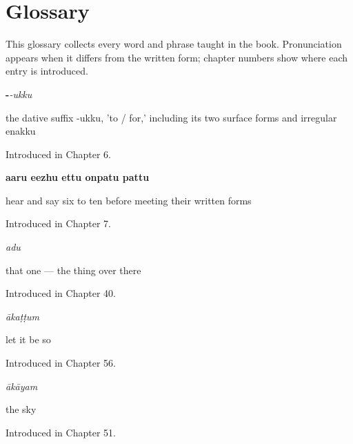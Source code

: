 
\chapter*{Glossary}

This glossary collects every word and phrase taught in the book. Pronunciation appears when it differs from the written form; chapter numbers show where each entry is introduced.

\noindent\begin{minipage}[t]{\linewidth}
\raggedright
\textbf{-}\enspace\emph{-ukku}\par
\small the dative suffix -ukku, 'to / for,' including its two surface forms and irregular enakku\par
\footnotesize Introduced in Chapter 6.
\end{minipage}\par\medskip

\noindent\begin{minipage}[t]{\linewidth}
\raggedright
\textbf{aaru eezhu ettu onpatu pattu}\par
\small hear and say six to ten before meeting their written forms\par
\footnotesize Introduced in Chapter 7.
\end{minipage}\par\medskip

\noindent\begin{minipage}[t]{\linewidth}
\raggedright
\textbf{}\enspace\emph{adu}\par
\small that one — the thing over there\par
\footnotesize Introduced in Chapter 40.
\end{minipage}\par\medskip

\noindent\begin{minipage}[t]{\linewidth}
\raggedright
\textbf{}\enspace\emph{ākaṭṭum}\par
\small let it be so\par
\footnotesize Introduced in Chapter 56.
\end{minipage}\par\medskip

\noindent\begin{minipage}[t]{\linewidth}
\raggedright
\textbf{}\enspace\emph{ākāyam}\par
\small the sky\par
\footnotesize Introduced in Chapter 51.
\end{minipage}\par\medskip

